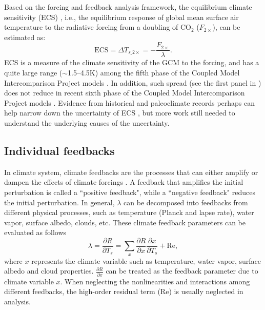 Based on the forcing and feedback analysis framework, the equilibrium climate sensitivity (ECS) , i.e., the equilibrium response of global mean surface air temperature to the radiative forcing from a doubling of CO$_2$ ($F_{2\times}$), can be estimated as:
\begin{equation}
    \text{ECS} = \Delta T_{s\_2\times}=-\frac{F_{2\times}}{\lambda}.
    \label{eq:ecs}
\end{equation}
ECS is a measure of the climate sensitivity of the GCM to the forcing, and has a quite large range ($\sim$1.5--4.5K) among the fifth phase of the Coupled Model Intercomparison Project \citep[CMIP5;][]{Taylor2012overview} models \citep[e.g.,][]{Andrews2012forcing,Ceppi2017}. In addition, such spread (see the first panel in ) does not reduce in recent sixth phase of the Coupled Model Intercomparison Project \citep[CMIP6;][]{Eyring2016overview} models \citep{Zelinka2020causes}. Evidence from historical and paleoclimate records perhaps can help narrow down the uncertainty of ECS \citep{Sherwood2020}, but more work still needed to understand the underlying causes of the uncertainty.

\subsection{Individual feedbacks}
\label{sec:individual_fbks}

In climate system, climate feedbacks are the processes that can either amplify or dampen the effects of climate forcings \citep{Hansen1984}. A feedback that amplifies the initial perturbation is called a ``positive feedback", while a ``negative feedback" reduces the initial perturbation. In general, $\lambda$ can be decomposed into feedbacks from different physical processes, such as temperature (Planck and lapse rate), water vapor, surface albedo, clouds, etc. These climate feedback parameters can be evaluated as follows
\begin{equation}
    \lambda = \frac{\partial R}{\partial T_s} = \sum_x \frac{\partial R}{\partial x}\frac{\partial x}{\partial T_s} + \text{Re}, %
    \label{eq:lambda}
\end{equation}
where $x$ represents the climate variable such as temperature, water vapor, surface albedo and cloud properties. $\frac{\partial R}{\partial x}$ can be treated as the feedback parameter due to climate variable $x$. When neglecting the nonlinearities and interactions among different feedbacks, the high-order residual term ($\text{Re}$) is usually neglected in analysis.

